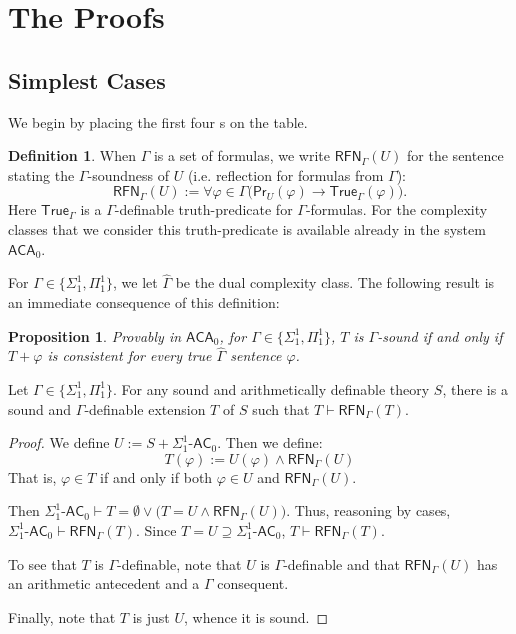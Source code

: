 \documentclass{amsart}
\newcommand{\xmark}{\ding{55}}%
\newtheorem{proposition}[theorem]{Proposition}
\theoremstyle{definition}
\newtheorem{definition}[theorem]{Definition}
\theoremstyle{remark}
\begin{document}
\section{The Proofs}

\subsection{Simplest Cases}
We begin by placing the first four \xmark s on the table.

\begin{definition}\label{reflection-dfn}
    When $\Gamma$ is a set of formulas, we write $\mathsf{RFN}_\Gamma(U)$ for the sentence stating the $\Gamma$-soundness of $U$ (i.e. reflection for formulas from $\Gamma$):
   $$\mathsf{RFN}_\Gamma(U):= \forall \varphi \in \Gamma\big( \mathsf{Pr}_U(\varphi) \to \mathsf{True}_\Gamma(\varphi) \big).$$
Here $\mathsf{True}_\Gamma$ is a $\Gamma$-definable truth-predicate for $\Gamma$-formulas. For the complexity classes that we consider this truth-predicate is available already in the system $\mathsf{ACA}_0$.
\end{definition}

For $\Gamma\in\{\Sigma^1_1,\Pi^1_1\}$, we let $\widehat\Gamma$ be the dual complexity class. The following result is an immediate consequence of this definition:
\begin{proposition}
    Provably in $\mathsf{ACA}_0$, for $\Gamma\in\{\Sigma^1_1,\Pi^1_1\}$, $T$ is $\Gamma$-sound if and only if $T+\varphi$ is consistent for every true $\widehat\Gamma$ sentence $\varphi$.
\end{proposition}

\begin{theorem}\label{general}
Let $\Gamma\in\{\Sigma^1_1,\Pi^1_1\}$. For any sound and arithmetically definable theory $S$, there is a sound and $\Gamma$-definable extension $T$ of $S$ such that $T\vdash \mathsf{RFN}_{\Gamma}(T)$.
\end{theorem}

\begin{proof}
   We define $U:=S+\Sigma^1_1\text{-}\mathsf{AC}_0$. Then we define:
   $$T(\varphi):= U(\varphi) \wedge \mathsf{RFN}_{\Gamma}(U)$$
   That is, $\varphi\in T$ if and only if both $\varphi\in U$ and $\mathsf{RFN}_{\Gamma}(U)$. 

   Then $\Sigma^1_1\text{-}\mathsf{AC}_0\vdash T=\emptyset \vee \big(T= U \wedge \mathsf{RFN}_{\Gamma}(U)\big)$. Thus, reasoning by cases, $\Sigma^1_1\text{-}\mathsf{AC}_0\vdash \mathsf{RFN}_{\Gamma}(T)$. Since $T= U \supseteq \Sigma^1_1\text{-}\mathsf{AC}_0$, $T\vdash \mathsf{RFN}_{\Gamma}(T)$.
   
   To see that $T$ is $\Gamma$-definable, note that $U$ is $\Gamma$-definable and that $\mathsf{RFN}_\Gamma(U)$
   has an arithmetic antecedent and a $\Gamma$ consequent.
   
   Finally, note that $T$ is just $U$, whence it is sound.
\end{proof}
\end{document}
